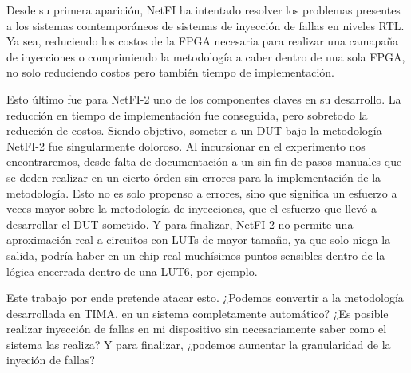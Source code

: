 Desde su primera aparición, NetFI ha intentado resolver los problemas presentes a los sistemas comtemporáneos de sistemas de inyección de fallas en niveles RTL. Ya sea, reduciendo los costos de la FPGA necesaria para realizar una camapaña de inyecciones o comprimiendo la metodología a caber dentro de una sola FPGA, no solo reduciendo costos pero también tiempo de implementación.

Esto último fue para NetFI-2 uno de los componentes claves en su desarrollo. La reducción en tiempo de implementación fue conseguida, pero sobretodo la reducción de costos. Siendo objetivo, someter a un DUT bajo la metodología NetFI-2 fue singularmente doloroso. Al incursionar en el experimento nos encontraremos, desde falta de documentación a un sin fin de pasos manuales que se deden realizar en un cierto órden sin errores para la implementación de la metodología. Esto no es solo propenso a errores, sino que significa un esfuerzo a veces mayor sobre la metodología de inyecciones, que el esfuerzo que llevó a desarrollar el DUT sometido. Y para finalizar, NetFI-2 no permite una aproximación real a circuitos con LUTs de mayor tamaño, ya que solo niega la salida, podría haber en un chip real muchísimos puntos sensibles dentro de la lógica encerrada dentro de una LUT6, por ejemplo.

Este trabajo por ende pretende atacar esto. ¿Podemos convertir a la metodología desarrollada en TIMA, en un sistema completamente automático? ¿Es posible realizar inyección de fallas en mi dispositivo sin necesariamente saber como el sistema las realiza? Y para finalizar, ¿podemos aumentar la granularidad de la inyeción de fallas?
